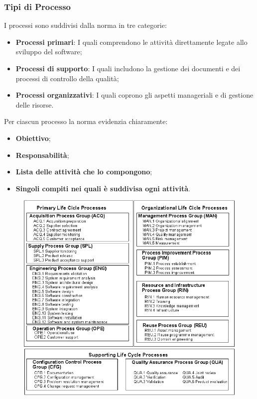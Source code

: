 \subsubsection{Tipi di Processo}
I processi sono suddivisi dalla norma in tre categorie:
\begin{itemize}
	\item \textbf{Processi primari}: I quali comprendono le attività direttamente legate allo sviluppo del software;
	\item \textbf{Processi di supporto}: I quali includono la gestione dei documenti e dei processi di controllo della qualità;
	\item \textbf{Processi organizzativi}: I quali coprono gli aspetti manageriali e di gestione delle risorse.
\end{itemize}
Per ciascun processo la norma evidenzia chiaramente:
\begin{itemize}
	\item \textbf{Obiettivo};
	\item \textbf{Responsabilità};
	\item \textbf{Lista delle attività che lo compongono};
	\item \textbf{Singoli compiti nei quali è suddivisa ogni attività}.
\end{itemize}
\begin{figure}[h!]
	\centering
	\includegraphics[scale=0.55]{img/ISO-IEC-12207-Processes.png}
\end{figure}
\newpage
